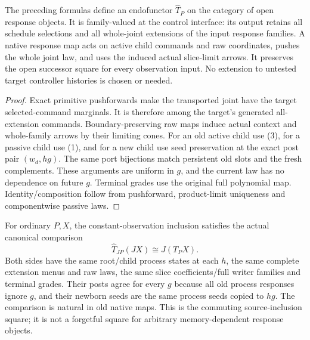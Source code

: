 \documentclass[11pt]{article}
\begin{document}
\begin{theorem}
The preceding formulas define an endofunctor $\widehat T_P$ on the category of open response objects. It is family-valued at the control interface: its output retains all schedule selections and all whole-joint extensions of the input response families. A native response map acts on active child commands and raw coordinates, pushes the whole joint law, and uses the induced actual slice-limit arrows. It preserves the open successor square for every observation input. No extension to untested target controller histories is chosen or needed.
\end{theorem}
\begin{proof}
Exact primitive pushforwards make the transported joint have the target selected-command marginals. It is therefore among the target's generated all-extension commands. Boundary-preserving raw maps induce actual context and whole-family arrows by their limiting cones. For an old active child use (3), for a passive child use (1), and for a new child use seed preservation at the exact post pair $(w_d,hg)$. The same port bijections match persistent old slots and the fresh complements. These arguments are uniform in $g$, and the current law has no dependence on future $g$. Terminal grades use the original full polynomial map. Identity/composition follow from pushforward, product-limit uniqueness and componentwise passive laws.\end{proof}

For ordinary $P,X$, the constant-observation inclusion satisfies the actual canonical comparison
\[
        \widehat T_{JP}(JX)\cong J(T_PX).
\]
Both sides have the same root/child process states at each $h$, the same complete extension menus and raw laws, the same slice coefficients/full writer families and terminal grades. Their posts agree for every $g$ because all old process responses ignore $g$, and their newborn seeds are the same process seeds copied to $hg$. The comparison is natural in old native maps. This is the commuting source-inclusion square; it is not a forgetful square for arbitrary memory-dependent response objects.
\end{document}
